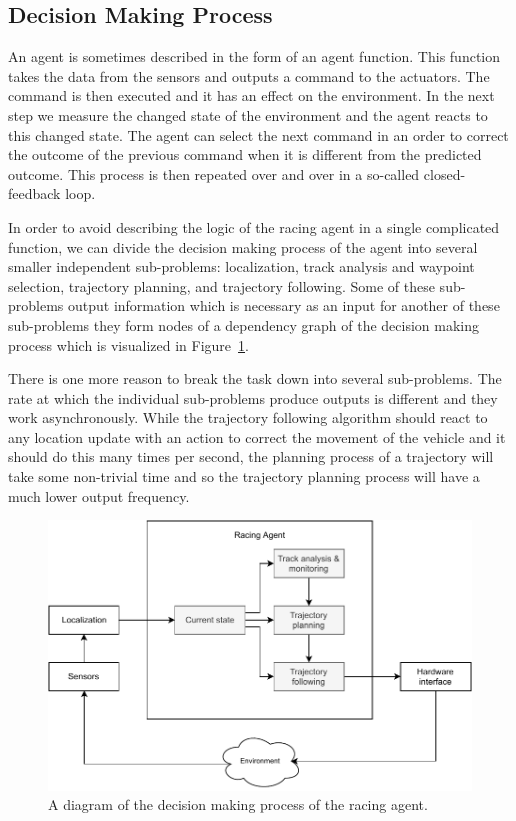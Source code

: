 \subsection{Decision Making Process}

An agent is sometimes described in the form of an agent function. This function takes the data from the sensors and outputs a command to the actuators. The command is then executed and it has an effect on the environment. In the next step we measure the changed state of the environment and the agent reacts to this changed state. The agent can select the next command in an order to correct the outcome of the previous command when it is different from the predicted outcome. This process is then repeated over and over in a so-called closed-feedback loop.

In order to avoid describing the logic of the racing agent in a single complicated function, we can divide the decision making process of the agent into several smaller independent sub-problems: localization, track analysis and waypoint selection, trajectory planning, and trajectory following. Some of these sub-problems output information which is necessary as an input for another of these sub-problems they form nodes of a dependency graph of the decision making process which is visualized in Figure~\ref{fig:racing_agent_diagram}.

There is one more reason to break the task down into several sub-problems. The rate at which the individual sub-problems produce outputs is different and they work asynchronously. While the trajectory following algorithm should react to any location update with an action to correct the movement of the vehicle and it should do this many times per second, the planning process of a trajectory will take some non-trivial time and so the trajectory planning process will have a much lower output frequency.

\begin{figure}[]\centering
	\includegraphics[width=125mm]{../img/racing_agent_diagram.pdf}
	\caption{A diagram of the decision making process of the racing agent.}
	\label{fig:racing_agent_diagram}
\end{figure}

